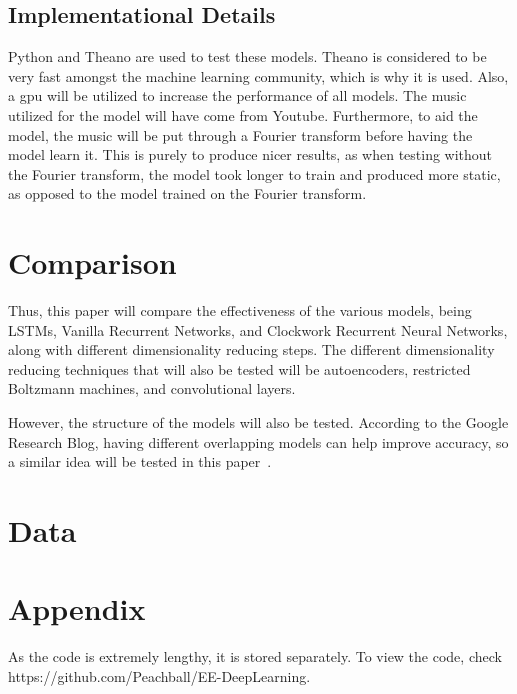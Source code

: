 \documentclass{article}
\begin{document}
\subsection{Implementational Details}
Python and Theano are used to test these models. Theano is considered to be very
fast amongst the machine learning community, which is why it is used. Also, a
gpu will be utilized to increase the performance of all models. The music
utilized for the model will have come from Youtube. Furthermore, to aid the
model, the music will be put through a Fourier transform before having the model
learn it. This is purely to produce nicer results, as when testing without the
Fourier transform, the model took longer to train and produced more static,
as opposed to the model trained on the Fourier transform.

\section{Comparison}
Thus, this paper will compare the effectiveness of the various models, being
LSTMs, Vanilla Recurrent Networks, and Clockwork Recurrent Neural Networks,
along with different dimensionality reducing steps. The different dimensionality
reducing techniques that will also be tested will be autoencoders, restricted
Boltzmann machines, and convolutional layers.

However, the structure of the models will also be tested. According to the
Google Research Blog, having different overlapping models can help improve
accuracy, so a similar idea will be tested in this paper~\cite{widendeep}.
\section{Data}

\section{Appendix}
As the code is extremely lengthy, it is stored separately. To view the code,
check https://github.com/Peachball/EE-DeepLearning.
\end{document}
